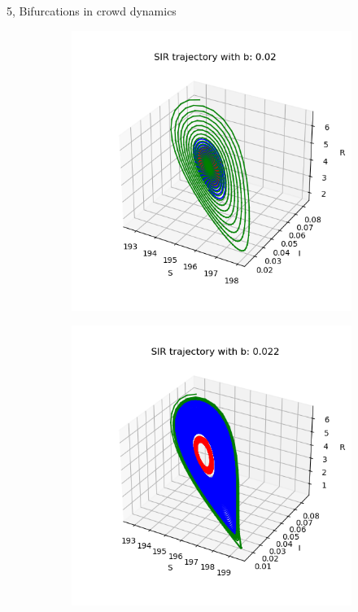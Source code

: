 \documentclass[10pt,a4paper]{article}
\begin{document}
\begin{task}{5, Bifurcations in crowd dynamics }
\begin{figure} [H]
\begin{subfigure} {0.33\textwidth}
\end{subfigure}
\begin{subfigure} {0.33\textwidth}
    \centering
    \label{task5-3-5}
    \includegraphics[width=.9\linewidth]{images/0.02.png} 
\end{subfigure}
\begin{subfigure} {0.33\textwidth}
    \centering
    \label{task5-3-6}
    \includegraphics[width=.9\linewidth]{images/0.022.png} 

\end{subfigure}
\end{figure}
\end{task}
\end{document}
